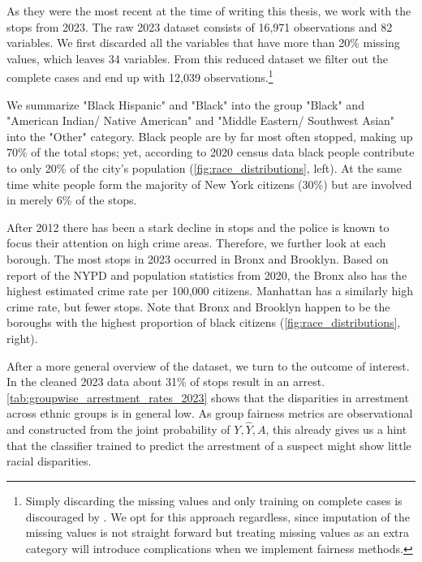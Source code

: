 As they were the most recent at the time of writing this thesis, we work with the stops from 2023. The raw 2023 dataset consists of 16,971 observations and 82 variables. We first discarded all the variables that have more than 20\% missing values, which leaves 34 variables.
From this reduced dataset we filter out the complete cases and end up with 12,039 observations.\footnote{Simply discarding the missing values and only training on complete cases is discouraged by \cite{fernando2021}. We opt for this approach regardless, since imputation of the missing values is not straight forward
but treating missing values as an extra category will introduce complications when we implement fairness methods.}\par

We summarize "Black Hispanic" and "Black" into the group "Black" and  "American Indian/ Native American" and "Middle Eastern/ Southwest Asian" into the "Other" category. Black people are by far most often stopped, making up 70\% of the total stops; yet, according to 2020 census data black people contribute to only 20\% of the city's population (\autoref{fig:race_distributions}, left). At the same time white people form the majority of New York citizens (30\%) but are involved in merely 6\% of the stops.\par 
After 2012 there has been a stark decline in stops and the police is known to focus their attention on high crime areas. Therefore, we further look at each borough. 
The most stops in 2023 occurred in Bronx and Brooklyn. Based on report of the NYPD and population statistics from 2020, the Bronx also has the highest estimated crime rate per 100,000 citizens. Manhattan has a similarly high crime rate, but fewer stops. Note that Bronx and Brooklyn happen to be the boroughs with the highest proportion of black citizens (\autoref{fig:race_distributions}, right).\par

After a more general overview of the dataset, we turn to the outcome of interest. In the cleaned 2023 data about 31\% of stops result in an arrest.
\autoref{tab:groupwise_arrestment_rates_2023} shows that the disparities in arrestment across ethnic groups is in general low.
As group fairness metrics are observational and constructed from the joint probability of $Y, \hat{Y}, A$, this already gives us a hint that the classifier trained to predict the arrestment of a suspect might show little racial disparities.


